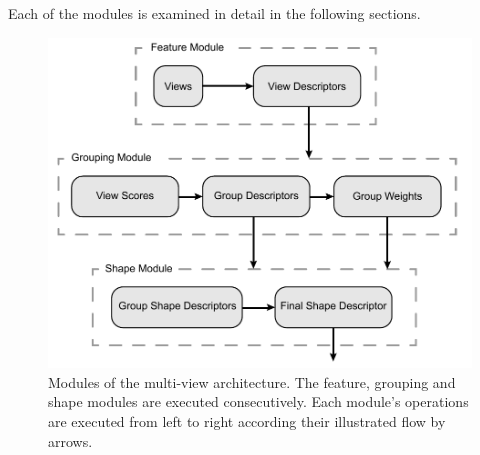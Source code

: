 Each of the modules is examined in detail in the following sections.
\begin{figure}
	\centering
	\includegraphics[]{images/multi_view_architecture.pdf}
	\caption{Modules of the multi-view architecture. The feature, grouping and shape modules are executed consecutively. Each module's operations are executed from left to right according their illustrated flow by arrows.}
	\label{fig:architecture-modules}
\end{figure}



